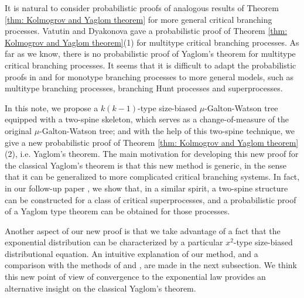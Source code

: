 \documentclass[12pt,a4paper]{amsart}
\numberwithin{equation}{section}
\begin{document}
	It is natural to consider probabilistic proofs of analogous results of Theorem \ref{thm: Kolmogrov and Yaglom theorem} for more general critical branching processes.
	Vatutin and  Dyakonova \cite{VD} gave a probabilistic proof of Theorem \ref{thm: Kolmogrov and Yaglom theorem}(1) for multitype critical branching processes.
	As far as we know, there is no probabilistic proof of Yaglom's theorem for multitype critical branching processes.
	It seems that it is difficult to adapt the probabilistic proofs in \cite{geiger2000new} and \cite{lyons1995conceptual} for monotype branching processes to more general models, such as multitype branching processes, branching Hunt processes and superprocesses.

	In this note, we propose a $k(k-1)$-type size-biased $\mu$-Galton-Watson tree equipped with a two-spine skeleton, which serves as a change-of-measure of the original $\mu$-Galton-Watson tree;
	and with the help of this two-spine technique, we give a new probabilistic proof of Theorem \ref{thm: Kolmogrov and Yaglom theorem}(2), i.e. Yaglom's theorem.
	The main motivation for developing this new proof for the classical Yaglom's theorem is that this new method is generic, in the sense that it can be generalized to more complicated critical branching systems.
	In fact, in our	follow-up
	paper \cite{RenSongSun2017Spine}, we show that, in a similar spirit, a two-spine structure can be constructed for a class of critical superprocesses, and a probabilistic proof of a Yaglom type theorem can be obtained for those processes.



	Another aspect of our new proof is that we take advantage of a fact that the exponential distribution can be characterized by a particular $x^2$-type size-biased distributional equation.
	An intuitive explanation of our method,
and a comparison with the methods of \cite{geiger2000new} and \cite{lyons1995conceptual}, are
	made in the next subsection.
	We think this new point of view of convergence to the exponential law provides an alternative insight on the classical Yaglom's theorem.
\end{document}
